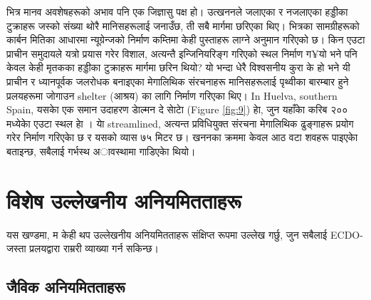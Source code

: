 \documentclass[10pt,twocolumn,letterpaper]{article}
\begin{document}
भित्र मानव अवशेषहरूको अभाव पनि एक जिज्ञासु पक्ष हो। उत्खननले जलाएका र नजलाएका हड्डीका टुक्राहरू जस्को संख्या थोरै मानिसहरूलाई जनाउँछ, ती सबै मार्गमा छरिएका थिए। भित्रका सामग्रीहरूको कार्बन मितिका आधारमा न्यूग्रेन्जको निर्माण कम्तिमा केही पुस्ताहरू लाग्ने अनुमान गरिएको छ। किन एउटा प्राचीन समुदायले यत्रो प्रयास गरेर विशाल, अत्यन्तै इन्जिनियरिङ्ग गरिएको स्थल निर्माण ग¥यो भने पनि केवल केही मृतकका हड्डीका टुक्राहरू मार्गमा छरिन थियो? यो भन्दा धेरै विश्वसनीय कुरा के हो भने यी प्राचीन र ध्यानपूर्वक जलरोधक बनाइएका मेगालिथिक संरचनाहरू मानिसहरूलाई पृथ्वीका बारम्बार हुने प्रलयहरूमा जोगाउन shelter (आश्रय) का लागि निर्माण गरिएका थिए।
In Huelva, southern Spain, यसकाे एक समान उदाहरण डाेल्मन दे साेटाे (Figure \ref{fig:9}) हाे, जुन यहाँकाे करिब २०० मध्येकाे एउटा स्थल हाे \cite{72,32}। याे streamlined, अत्यन्त प्रविधियुक्त संरचना मेगालिथिक ढुङ्गाहरू प्रयोग गरेर निर्माण गरिएकाे छ र यसको व्यास ७५ मिटर छ। खननका क्रममा केवल आठ वटा शवहरू पाइएकाे बताइन्छ, सबैलाई गर्भस्थ अावस्थामा गाडिएकाे थियो।

\section{विशेष उल्लेखनीय अनियमितताहरू}

यस खण्डमा, म केही थप उल्लेखनीय अनियमितताहरू संक्षिप्त रूपमा उल्लेख गर्छु, जुन सबैलाई ECDO-जस्ता प्रलयद्वारा राम्ररी व्याख्या गर्न सकिन्छ।

\subsection{जैविक अनियमितताहरू}
\end{document}
